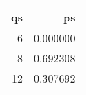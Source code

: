 \begin{tabular}{rr}
\toprule
 qs &        ps \\
\midrule
  6 &  0.000000 \\
  8 &  0.692308 \\
 12 &  0.307692 \\
\bottomrule
\end{tabular}

